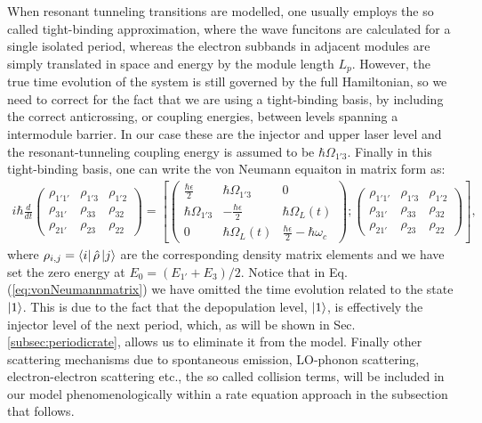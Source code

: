 \documentclass[10pt,letterpaper]{article}
\begin{document}
When resonant tunneling transitions are modelled, one usually employs the so called tight-binding approximation, where the wave funcitons are calculated for a single isolated period, whereas the electron subbands in adjacent modules are simply translated in space and energy by the module length $L_p$. However, the true time evolution of the system is still governed by the full Hamiltonian, so we need to correct for the fact that we are using a tight-binding basis, by including the correct anticrossing, or coupling energies, between levels spanning a intermodule barrier. In our case these are the injector and upper laser level and the resonant-tunneling coupling energy is assumed to be $\hbar \Omega_{1'3}$. Finally in this tight-binding basis, one can write the von Neumann equaiton in matrix form as:
\begin{align}
 \label{eq:vonNeumannmatrix}
i \hbar \frac{d}{dt} \begin{pmatrix}
\rho_{1'1'}& \rho_{1'3} & \rho_{1'2} \\
\rho_{31'} & \rho_{33} & \rho_{32} \\ 
\rho_{21'} & \rho_{23} & \rho_{22}
\end{pmatrix}  = 
\left [ 
\begin{pmatrix} 
 \frac{\hbar \epsilon}{2} & \hbar\Omega_{1'3} & 0 \\
\hbar\Omega_{1'3}  & -\frac{\hbar	\epsilon}{2} &  \hbar\Omega_{L}(t) \\
0  &\hbar\Omega_{L}(t) & \frac{\hbar \epsilon}{2}-\hbar\omega_{c}   
\end{pmatrix} 
; 
\begin{pmatrix}
\rho_{1'1'}& \rho_{1'3} & \rho_{1'2} \\
\rho_{31'} & \rho_{33} & \rho_{32} \\ 
\rho_{21'} & \rho_{23} & \rho_{22}
\end{pmatrix}
\right ] , 
\end{align}
where $\rho_{i,j} = \Bra{i} \hat{\rho} \Ket{j}$ are the corresponding density matrix elements and we have set the zero energy at $E_0 = (E_{1'}+E_{3})/2 $. Notice that in Eq. (\ref{eq:vonNeumannmatrix}) we have omitted the time evolution related to the state $\Ket{1}$. This is due to the fact that the depopulation level, $\Ket{1}$, is effectively the injector level of the next period, which, as will be shown in Sec. \ref{subsec:periodicrate}, allows us to eliminate it from the model. Finally other scattering mechanisms due to spontaneous emission, LO-phonon scattering, electron-electron scattering etc., the so called collision terms, will be included in our model phenomenologically within a rate equation approach in the subsection that follows. 
\end{document}
